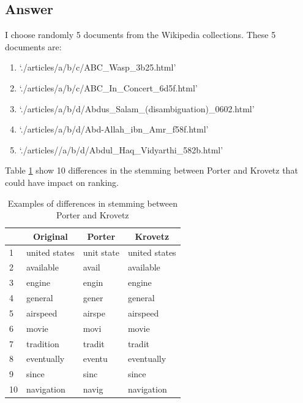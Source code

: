 \documentclass[letterpaper,11pt]{article}
\begin{document}
\subsection*{Answer}

I choose randomly 5 documents from the Wikipedia collections. These 5 documents are:
\begin{enumerate}
\item `./articles/a/b/c/ABC\_Wasp\_3b25.html'
\item `./articles/a/b/c/ABC\_In\_Concert\_6d5f.html'
\item `./articles/a/b/d/Abdus\_Salam\_(disambiguation)\_0602.html'
\item `./articles/a/b/d/Abd-Allah\_ibn\_Amr\_f58f.html'
\item `./articles//a/b/d/Abdul\_Haq\_Vidyarthi\_582b.html'
\end{enumerate}
Table \ref{tab:porter-krovetz} show 10 differences in the stemming between Porter and Krovetz that could have impact on ranking. 

\begin{table}[H]
\centering
\begin{tabular}{|l|l|l|l|}
\hline
\rowcolor[HTML]{ECF4FF} 
\multicolumn{1}{|c|}{\cellcolor[HTML]{ECF4FF}\textbf{No}} & \multicolumn{1}{c|}{\cellcolor[HTML]{ECF4FF}\textbf{Original}} & \multicolumn{1}{c|}{\cellcolor[HTML]{ECF4FF}\textbf{Porter}} & \multicolumn{1}{c|}{\cellcolor[HTML]{ECF4FF}\textbf{Krovetz}} \\ \hline
1 & united states & unit state & united states \\ \hline
2 & available & avail & available \\ \hline
3 & engine & engin & engine \\ \hline
4 & general & gener & general \\ \hline
5 & airspeed & airspe & airspeed \\ \hline
6 & movie & movi & movie \\ \hline
7 & tradition & tradit & tradit \\ \hline
8 & eventually & eventu & eventually \\ \hline
9 & since & sinc & since \\ \hline
10 & navigation & navig & navigation \\ \hline
\end{tabular}
\caption{Examples of differences in stemming between Porter and Krovetz}
\label{tab:porter-krovetz}
\end{table}
\end{document}
